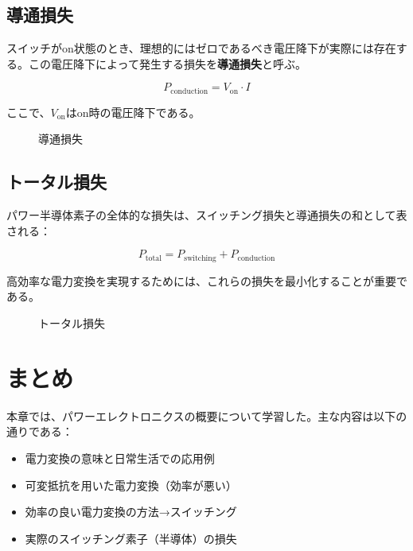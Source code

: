 \subsection{導通損失}

スイッチがon状態のとき、理想的にはゼロであるべき電圧降下が実際には存在する。この電圧降下によって発生する損失を\textbf{導通損失}と呼ぶ。

\begin{equation}
P_{\text{conduction}} = V_{\text{on}} \cdot I
\end{equation}

ここで、$V_{\text{on}}$はon時の電圧降下である。

\begin{figure}[H]
\centering
{}
\caption{導通損失}
\label{fig:conduction_loss}
\end{figure}

\subsection{トータル損失}

パワー半導体素子の全体的な損失は、スイッチング損失と導通損失の和として表される：

\begin{equation}
P_{\text{total}} = P_{\text{switching}} + P_{\text{conduction}}
\end{equation}

高効率な電力変換を実現するためには、これらの損失を最小化することが重要である。

\begin{figure}[H]
\centering
{}
\caption{トータル損失}
\label{fig:total_loss}
\end{figure}

\section{まとめ}

本章では、パワーエレクトロニクスの概要について学習した。主な内容は以下の通りである：

\begin{itemize}
\item 電力変換の意味と日常生活での応用例
\item 可変抵抗を用いた電力変換（効率が悪い）
\item 効率の良い電力変換の方法→スイッチング
\item 実際のスイッチング素子（半導体）の損失
\end{itemize}

